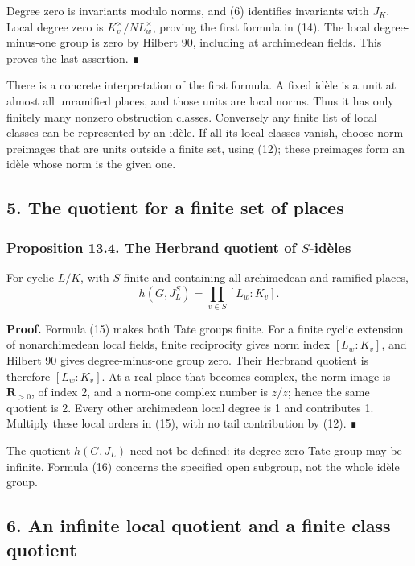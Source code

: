 \documentclass[11pt,a4paper]{article}
\begin{document}
Degree zero is invariants modulo norms, and (6) identifies invariants
with \(J_K\). Local degree zero is \(K_v^\times/N L_w^\times\), proving
the first formula in (14). The local degree-minus-one group is zero by
Hilbert 90, including at archimedean fields. This proves the last
assertion. ∎

There is a concrete interpretation of the first formula. A fixed idèle
is a unit at almost all unramified places, and those units are local
norms. Thus it has only finitely many nonzero obstruction classes.
Conversely any finite list of local classes can be represented by an
idèle. If all its local classes vanish, choose norm preimages that are
units outside a finite set, using (12); these preimages form an idèle
whose norm is the given one.

\subsection{5. The quotient for a finite set of
places}\label{the-quotient-for-a-finite-set-of-places}

\subsubsection{\texorpdfstring{Proposition 13.4. The Herbrand quotient
of
\(S\)-idèles}{Proposition 13.4. The Herbrand quotient of S-idèles}}\label{proposition-13.4.-the-herbrand-quotient-of-s-iduxe8les}

For cyclic \(L/K\), with \(S\) finite and containing all archimedean and
ramified places, \[
h(G,J_L^S)=\prod_{v\in S}[L_w:K_v].
\tag{16}
\]

\textbf{Proof.} Formula (15) makes both Tate groups finite. For a finite
cyclic extension of nonarchimedean local fields, finite reciprocity
gives norm index \([L_w:K_v]\), and Hilbert 90 gives degree-minus-one
group zero. Their Herbrand quotient is therefore \([L_w:K_v]\). At a
real place that becomes complex, the norm image is \(\mathbf R_{>0}\),
of index 2, and a norm-one complex number is \(z/\bar z\); hence the
same quotient is 2. Every other archimedean local degree is 1 and
contributes 1. Multiply these local orders in (15), with no tail
contribution by (12). ∎

The quotient \(h(G,J_L)\) need not be defined: its degree-zero Tate
group may be infinite. Formula (16) concerns the specified open
subgroup, not the whole idèle group.

\subsection{6. An infinite local quotient and a finite class
quotient}\label{an-infinite-local-quotient-and-a-finite-class-quotient}
\end{document}
